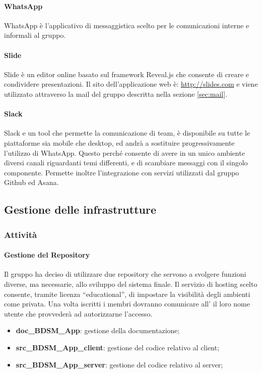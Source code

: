 			\paragraph{WhatsApp}
			WhatsApp è l'applicativo di messaggistica scelto per le comunicazioni interne e informali al gruppo.
			\paragraph{Slide}
			Slide è un editor online basato sul framework Reveal.js che consente di creare e condividere presentazioni. \newline
			Il sito dell'applicazione web è: \url{http://slides.com} e viene utilizzato attraverso la mail del gruppo descritta nella sezione \ref{sec:mail}.
			\paragraph{Slack}
			Slack e un tool che permette la comunicazione di team, è disponibile su tutte le piattaforme sia mobile che desktop, ed andrà a sostituire progressivamente l'utilizzo di WhatsApp. Questo perché consente di avere in un unico ambiente diversi canali riguardanti temi differenti, e di scambiare messaggi con il singolo componente. Permette inoltre l'integrazione con servizi utilizzati dal gruppo Github ed Asana. 


	\subsection{Gestione delle infrastrutture}

		\subsubsection{Attività}
			\paragraph{Gestione del Repository}
			Il gruppo ha deciso di utilizzare due repository che servono a svolgere funzioni diverse, ma necessarie, allo sviluppo del sistema finale. \newline
			Il servizio di hosting scelto consente, tramite licenza ``educational'', di impostare la visibilità degli ambienti come privata. \newline
			Una volta iscritti i membri dovranno comunicare all'\roleAdministrator{} il loro nome utente che provvederà ad autorizzarne l'accesso.
				\begin{itemize}
					\item \textbf{doc\_BDSM\_App}: gestione della documentazione;
					\item \textbf{src\_BDSM\_App\_client}: gestione del codice relativo al client;
					\item \textbf{src\_BDSM\_App\_server}: gestione del codice relativo al server;
				\end{itemize}
